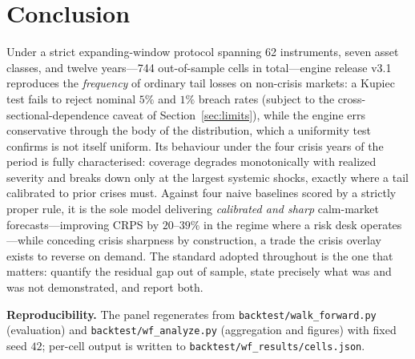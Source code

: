 \documentclass[11pt]{article}
\begin{document}
\section{Conclusion}
Under a strict expanding-window protocol spanning 62 instruments, seven asset
classes, and twelve years---744 out-of-sample cells in total---engine release v3.1
reproduces the \emph{frequency} of ordinary tail losses on non-crisis markets: a
Kupiec test fails to reject nominal $5\%$ and $1\%$ breach rates (subject to the
cross-sectional-dependence caveat of Section~\ref{sec:limits}), while the engine
errs conservative through the body of the distribution, which a uniformity test
confirms is not itself uniform. Its behaviour under the four crisis years of the
period is fully characterised: coverage degrades monotonically with realized
severity and breaks down only at the largest systemic shocks, exactly where a
tail calibrated to prior crises must. Against four naive baselines scored by a
strictly proper rule, it is the sole model delivering \emph{calibrated and sharp}
calm-market forecasts---improving CRPS by $20$--$39\%$ in the regime where a risk
desk operates---while conceding crisis sharpness by construction, a trade the
crisis overlay exists to reverse on demand. The standard adopted throughout is the
one that matters: quantify the residual gap out of sample, state precisely what
was and was not demonstrated, and report both.

\vspace{0.5em}
\noindent\textbf{Reproducibility.} The panel regenerates from
\texttt{backtest/walk\_forward.py} (evaluation) and \texttt{backtest/wf\_analyze.py}
(aggregation and figures) with fixed seed $42$; per-cell output is written to
\texttt{backtest/wf\_results/cells.json}.
\end{document}
